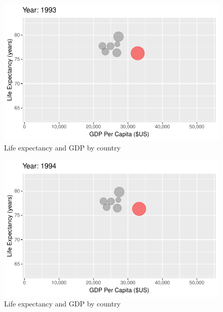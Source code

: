 \documentclass[
  letterpaper,
  DIV=11,
  numbers=noendperiod]{scrreport}
\theoremstyle{definition}
\theoremstyle{remark}
\begin{document}
\begin{figure}

{\centering \includegraphics{index_files/figure-pdf/fig-anim-country-75.pdf}

}

\caption{\label{fig-anim-country-75}Life expectancy and GDP by country}

\end{figure}

\begin{figure}

{\centering \includegraphics{index_files/figure-pdf/fig-anim-country-76.pdf}

}

\caption{\label{fig-anim-country-76}Life expectancy and GDP by country}

\end{figure}
\end{document}

